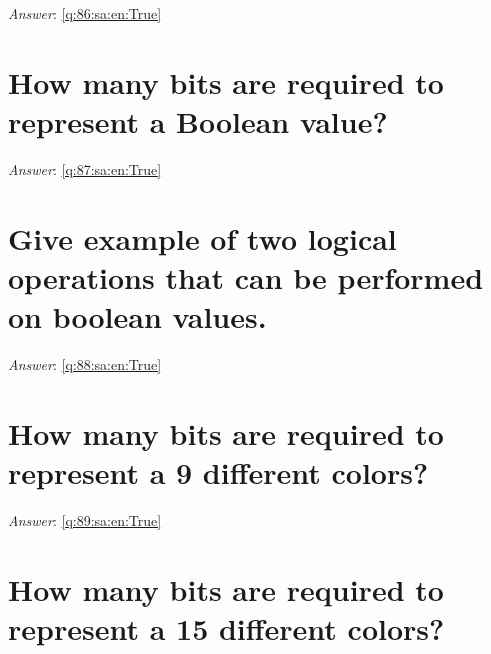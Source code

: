 \documentclass[a4paper,11pt,oneside]{book}
\begin{document}
\begin{sloppypar}
\vspace{1cm}

\textit{Answer}: \autoref{q:86:sa:en:True}



\section{How many bits are required to represent a Boolean value?}

\label{q:87:sa:en:False}

\vspace{2cm}

\noindent\makebox[\textwidth]{\hrulefill}

\vspace{1cm}

\textit{Answer}: \autoref{q:87:sa:en:True}



\section{Give example of two logical operations that can be performed on boolean values.}

\label{q:88:sa:en:False}

\vspace{2cm}

\noindent\makebox[\textwidth]{\hrulefill}

\vspace{1cm}

\textit{Answer}: \autoref{q:88:sa:en:True}



\section{How many bits are required to represent a 9 different colors?}

\label{q:89:sa:en:False}

\vspace{2cm}

\noindent\makebox[\textwidth]{\hrulefill}

\vspace{1cm}

\textit{Answer}: \autoref{q:89:sa:en:True}



\section{How many bits are required to represent a 15 different colors?}


\end{sloppypar}
\end{document}

